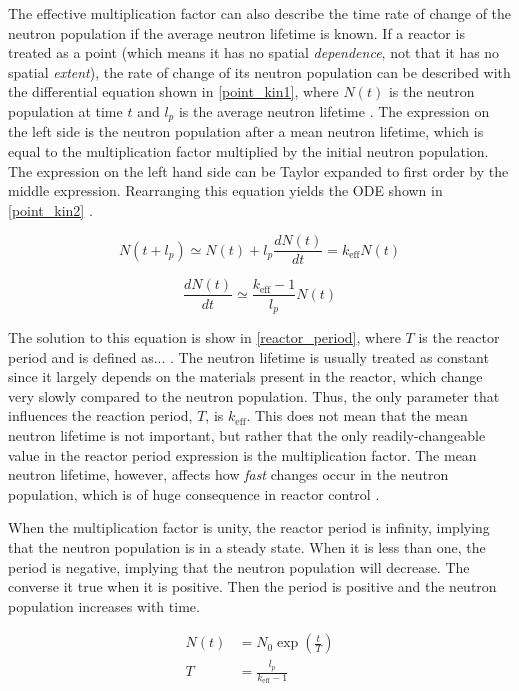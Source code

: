 The effective multiplication factor can also describe the time rate of change of the neutron population if the average neutron lifetime is known.  If a reactor is treated as a point (which means it has no spatial \emph{dependence}, not that it has no spatial \emph{extent}), the rate of change of its neutron population can be described with the differential equation shown in \eqref{point_kin1}, where $N(t)$ is the neutron population at time $t$ and $l_p$ is the average neutron lifetime \cite{duderstadt}.  The expression on the left side is the neutron population after a mean neutron lifetime, which is equal to the multiplication factor multiplied by the initial neutron population.  The expression on the left hand side can be Taylor expanded to first order by the middle expression.  Rearranging this equation yields the ODE shown in  \eqref{point_kin2} \cite{duderstadt}.

\begin{equation}
\label{point_kin1}
N(t+l_p) \simeq N(t)+l_p \frac{dN(t)}{dt} = k_\mathrm{eff} N(t) 
\end{equation}

\begin{equation}
\label{point_kin2}
\frac{dN(t)}{dt} \simeq \frac{k_\mathrm{eff} -1}{l_p}N(t)
\end{equation}

The solution to this equation is show in \eqref{reactor_period}, where $T$ is the reactor period and is defined as... \cite{duderstadt}.  The neutron lifetime is usually treated as constant since it largely depends on the materials present in the reactor, which change very slowly compared to the neutron population. Thus, the only parameter that influences the reaction period, $T$, is $k_\mathrm{eff}$.  This does not mean that the mean neutron lifetime is not important, but rather that the only readily-changeable value in the reactor period expression is the multiplication factor.  The mean neutron lifetime, however, affects how \emph{fast} changes occur in the neutron population, which is of huge consequence in reactor control \cite{duderstadt}.  

When the multiplication factor is unity, the reactor period is infinity, implying that the neutron population is in a steady state.  When it is less than one, the period is negative, implying that the neutron population will decrease.  The converse it true when it is positive.  Then the period is positive and the neutron population increases with time.

\begin{equation}
\label{reactor_period}
\begin{split}
N(t) &= N_0 \exp \left( \frac{t}{T} \right) \\
T &= \frac{l_p}{k_\mathrm{eff} -1}
\end{split}
\end{equation}

